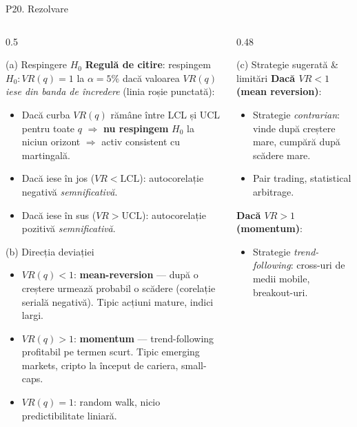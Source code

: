 \documentclass[9pt, aspectratio=169, t]{beamer}
\begin{document}
\begin{frame}[shrink=22]{P20. Rezolvare}
\begin{columns}[T]
\begin{column}{0.5\textwidth}
\begin{block}{(a) Respingere $H_0$}
\textbf{Regulă de citire}: respingem $H_0: VR(q)=1$ la $\alpha=5\%$ dacă valoarea $VR(q)$ \emph{iese din banda de încredere} (linia roșie punctată):
\begin{itemize}\setlength{\itemsep}{0pt}
\item Dacă curba $VR(q)$ rămâne între LCL și UCL pentru toate $q$ $\Rightarrow$ \textbf{nu respingem} $H_0$ la niciun orizont $\Rightarrow$ activ consistent cu martingală.
\item Dacă iese în jos ($VR<\text{LCL}$): autocorelație negativă \emph{semnificativă}.
\item Dacă iese în sus ($VR>\text{UCL}$): autocorelație pozitivă \emph{semnificativă}.
\end{itemize}
\end{block}
\begin{block}{(b) Direcția deviației}
\begin{itemize}\setlength{\itemsep}{0pt}
\item $VR(q)<1$: \textbf{mean-reversion} --- după o creștere urmează probabil o scădere (corelație serială negativă). Tipic acțiuni mature, indici largi.
\item $VR(q)>1$: \textbf{momentum} --- trend-following profitabil pe termen scurt. Tipic emerging markets, cripto la început de cariera, small-caps.
\item $VR(q)=1$: random walk, nicio predictibilitate liniară.
\end{itemize}
\end{block}
\end{column}
\begin{column}{0.48\textwidth}
\begin{block}{(c) Strategie sugerată \& limitări}
\textbf{Dacă $VR<1$ (mean reversion)}:
\begin{itemize}\setlength{\itemsep}{0pt}
\item Strategie \emph{contrarian}: vinde după creștere mare, cumpără după scădere mare.
\item Pair trading, statistical arbitrage.
\end{itemize}
\textbf{Dacă $VR>1$ (momentum)}:
\begin{itemize}\setlength{\itemsep}{0pt}
\item Strategie \emph{trend-following}: cross-uri de medii mobile, breakout-uri.

\end{itemize}
\end{block}
\end{column}
\end{columns}
\end{frame}
\end{document}
